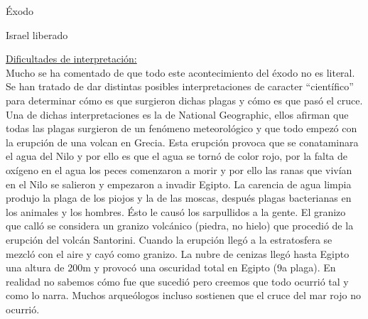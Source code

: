 \begin{section}{Éxodo}
\begin{subsection}{Israel liberado}
\begin{enumerate}
				\underline{Dificultades de interpretación:}\\
				Mucho se ha comentado de que todo este acontecimiento del éxodo no es literal. Se han tratado de dar distintas posibles interpretaciones de caracter ``científico'' para determinar cómo es que surgieron dichas plagas y cómo es que pasó el cruce.\\
				Una de dichas interpretaciones es la de National Geographic, ellos afirman que todas las plagas surgieron de un fenómeno meteorológico y que todo empezó con la erupción de una volcan en Grecia. Esta erupción provoca  que se conataminara el agua del Nilo y por ello es que el agua se tornó de color rojo, por la falta de oxígeno en el agua los peces comenzaron a morir y por ello las ranas que vivían en el Nilo se salieron y empezaron a invadir Egipto. La carencia de agua limpia produjo la plaga de los piojos y la de las moscas, después plagas bacterianas en los animales y los hombres. Ésto le causó los sarpullidos a la gente. El granizo que calló se considera un granizo volcánico (piedra, no hielo) que procedió de la erupción del volcán Santorini. Cuando la erupción llegó a la estratosfera se mezcló con el aire y cayó como granizo. La nubre de cenizas llegó hasta Egipto una altura de 200m y provocó una oscuridad total en Egipto (9a plaga).\newpage
				En realidad no sabemos cómo fue que sucedió pero creemos que todo ocurrió tal y como lo narra. Muchos arqueólogos incluso sostienen que el cruce del mar rojo no ocurrió.\\

		\end{enumerate}



\end{subsection}
\end{section}
